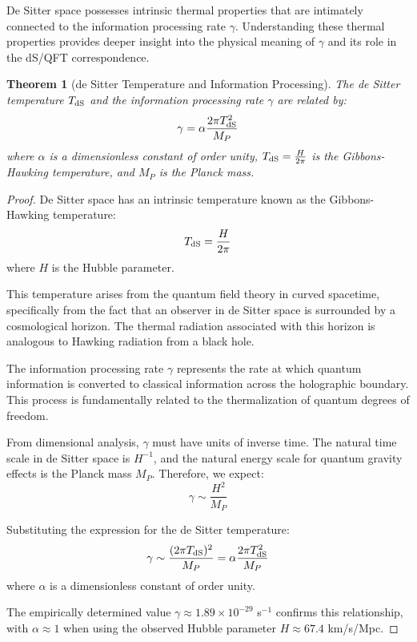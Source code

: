 \documentclass[11pt,english,twoside]{article}
\theoremstyle{plain}
\newtheorem{theorem}{Theorem}[section]
\theoremstyle{definition}
\theoremstyle{remark}
\newcommand{\dS}{{\rm dS}}
\newcommand{\gammaR}{\gamma}
\begin{document}
De Sitter space possesses intrinsic thermal properties that are intimately connected to the information processing rate $\gammaR$. Understanding these thermal properties provides deeper insight into the physical meaning of $\gammaR$ and its role in the dS/QFT correspondence.

\begin{theorem}[de Sitter Temperature and Information Processing]
\label{thm:ds_temperature}
The de Sitter temperature $T_{\dS}$ and the information processing rate $\gammaR$ are related by:
\begin{equation}
\gammaR = \alpha \frac{2\pi T_{\dS}^2}{M_P}
\end{equation}
where $\alpha$ is a dimensionless constant of order unity, $T_{\dS} = \frac{H}{2\pi}$ is the Gibbons-Hawking temperature, and $M_P$ is the Planck mass.
\end{theorem}

\begin{proof}
De Sitter space has an intrinsic temperature known as the Gibbons-Hawking temperature:
\begin{equation}
T_{\dS} = \frac{H}{2\pi}
\end{equation}
where $H$ is the Hubble parameter.

This temperature arises from the quantum field theory in curved spacetime, specifically from the fact that an observer in de Sitter space is surrounded by a cosmological horizon. The thermal radiation associated with this horizon is analogous to Hawking radiation from a black hole.

The information processing rate $\gammaR$ represents the rate at which quantum information is converted to classical information across the holographic boundary. This process is fundamentally related to the thermalization of quantum degrees of freedom.

From dimensional analysis, $\gammaR$ must have units of inverse time. The natural time scale in de Sitter space is $H^{-1}$, and the natural energy scale for quantum gravity effects is the Planck mass $M_P$. Therefore, we expect:
\begin{equation}
\gammaR \sim \frac{H^2}{M_P}
\end{equation}

Substituting the expression for the de Sitter temperature:
\begin{equation}
\gammaR \sim \frac{(2\pi T_{\dS})^2}{M_P} = \alpha \frac{2\pi T_{\dS}^2}{M_P}
\end{equation}
where $\alpha$ is a dimensionless constant of order unity.

The empirically determined value $\gammaR \approx 1.89 \times 10^{-29}$ s$^{-1}$ confirms this relationship, with $\alpha \approx 1$ when using the observed Hubble parameter $H \approx 67.4$ km/s/Mpc.
\end{proof}
\end{document}
